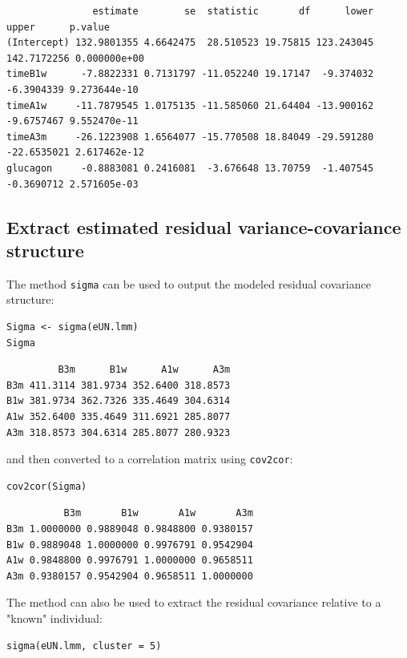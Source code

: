 \documentclass[12pt]{article}
\begin{document}
\begin{verbatim}
               estimate        se  statistic       df      lower       upper      p.value
(Intercept) 132.9801355 4.6642475  28.510523 19.75815 123.243045 142.7172256 0.000000e+00
timeB1w      -7.8822331 0.7131797 -11.052240 19.17147  -9.374032  -6.3904339 9.273644e-10
timeA1w     -11.7879545 1.0175135 -11.585060 21.64404 -13.900162  -9.6757467 9.552470e-11
timeA3m     -26.1223908 1.6564077 -15.770508 18.84049 -29.591280 -22.6535021 2.617462e-12
glucagon     -0.8883081 0.2416081  -3.676648 13.70759  -1.407545  -0.3690712 2.571605e-03
\end{verbatim}

\subsection{Extract estimated residual variance-covariance structure}
\label{sec:org29f0ee8}

The method \texttt{sigma} can be used to output the modeled residual
covariance structure:
\lstset{language=r,label= ,caption= ,captionpos=b,numbers=none}
\begin{lstlisting}
Sigma <- sigma(eUN.lmm)
Sigma
\end{lstlisting}

\begin{verbatim}
         B3m      B1w      A1w      A3m
B3m 411.3114 381.9734 352.6400 318.8573
B1w 381.9734 362.7326 335.4649 304.6314
A1w 352.6400 335.4649 311.6921 285.8077
A3m 318.8573 304.6314 285.8077 280.9323
\end{verbatim}


and then converted to a correlation matrix using \texttt{cov2cor}:
\lstset{language=r,label= ,caption= ,captionpos=b,numbers=none}
\begin{lstlisting}
cov2cor(Sigma)
\end{lstlisting}

\begin{verbatim}
          B3m       B1w       A1w       A3m
B3m 1.0000000 0.9889048 0.9848800 0.9380157
B1w 0.9889048 1.0000000 0.9976791 0.9542904
A1w 0.9848800 0.9976791 1.0000000 0.9658511
A3m 0.9380157 0.9542904 0.9658511 1.0000000
\end{verbatim}


The method can also be used to extract the residual covariance
relative to a "known" individual:
\lstset{language=r,label= ,caption= ,captionpos=b,numbers=none}
\begin{lstlisting}
sigma(eUN.lmm, cluster = 5)
\end{lstlisting}
\end{document}
